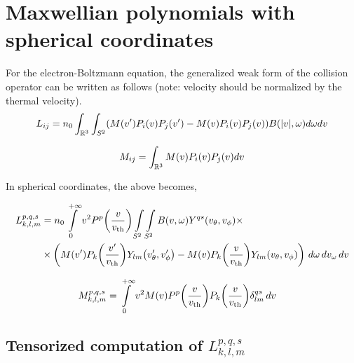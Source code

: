 \documentclass{article}
\newcommand{\myint}[2]{\int\limits_{#1}^{#2}}
\newcommand{\diff}[1]{\, d#1}
\newcommand{\of}[1]{\mleft( #1 \mright)}
\newcommand{\vth}{v_\textrm{th}}
\begin{document}

\section{Maxwellian polynomials with spherical coordinates}

For the electron-Boltzmann equation, the generalized weak form of the collision operator can be written as follows (note: velocity should be normalized by the thermal velocity).
\begin{equation}
    L_{ij} = n_0 \int_{\mathbb{R}^3} \int_{S^2} (M(v^\prime) P_i(v)P_j(v^\prime)  - M(v) P_i(v) P_j(v) )  B(|v|,\omega) d\omega dv \label{eq:cOp}
\end{equation}

\begin{equation}
    M_{ij} = \int_{\mathbb{R}^3} M(v) P_i(v)P_j(v) dv
\end{equation}

In spherical coordinates, the above becomes, 

\begin{align*}
    {L}_{k,l,m}^{p,q,s} &=n_0
    \myint{0}{+\infty} 
    v^2
    P^p \of{\frac{v}{\vth}} 
    \myint{S^2}{}
    \myint{S^2}{}
    B\of{v,\omega} Y^{qs}\of{v_\theta, v_\phi} 
     \times
    \\
    & \times
    \left(
    M\of{v^\prime} P_k\of{\frac{v^\prime}{\vth}} Y_{lm}\of{v_\theta^\prime, v_\phi^\prime}
    -
    M\of{v} P_k\of{\frac{v}{\vth}} Y_{lm}\of{v_\theta, v_\phi}
    \right)
    \diff{\omega}
    \diff{v_\omega}
    \diff{v} 
\end{align*}

\begin{align*}
    {M}_{k,l,m}^{p,q,s} &=
    \myint{0}{+\infty} 
    v^2
    M\of{v} P^p \of{\frac{v}{\vth}}  P_k \of{\frac{v}{\vth}} \delta^{qs}_{lm}
    \diff{v} 
\end{align*}

\subsection{Tensorized computation of ${L}_{k,l,m}^{p,q,s}$}
\end{document}

